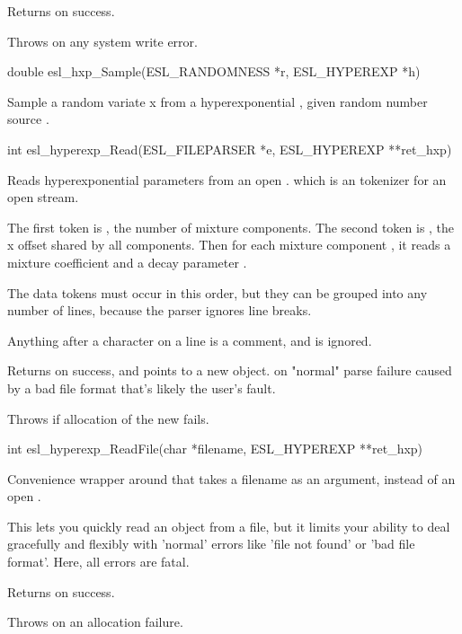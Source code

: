 \begin{sreapi}
Returns  on success.

Throws  on any system write error. 


\hypertarget{func:esl_hxp_Sample()}
{\item[double esl\_hxp\_Sample(ESL\_RANDOMNESS *r, ESL\_HYPEREXP *h)]}

Sample a random variate x from a hyperexponential , 
given random number source .


\hypertarget{func:esl_hyperexp_Read()}
{\item[int esl\_hyperexp\_Read(ESL\_FILEPARSER *e, ESL\_HYPEREXP **ret\_hxp)]}

Reads hyperexponential parameters from an open .
which is an  tokenizer for an open stream.

The first token is , the number of mixture components.
The second token is , the x offset shared by all components.
Then for each mixture component , it reads
a mixture coefficient  and a decay parameter
.

The  data tokens must occur in this order, but
they can be grouped into any number of lines, because the
parser ignores line breaks.

Anything after a \ccode{\#} character on a line is a comment, and
is ignored.

Returns  on success, and  points to a new 
object.
 on "normal" parse failure caused by a bad file 
format that's likely the user's fault.

Throws  if allocation of the new  fails.




\hypertarget{func:esl_hyperexp_ReadFile()}
{\item[int esl\_hyperexp\_ReadFile(char *filename, ESL\_HYPEREXP **ret\_hxp)]}

Convenience wrapper around  that takes
a filename as an argument, instead of an open .

This lets you quickly read an object from a file, but it
limits your ability to deal gracefully and flexibly with
'normal' errors like 'file not found' or 'bad file format'.
Here, all errors are fatal.

Returns  on success.

Throws  on an allocation failure.


\end{sreapi}
